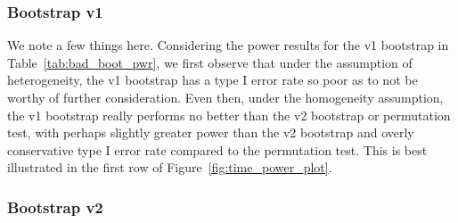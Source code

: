 \documentclass{article}
\begin{document}
\subsubsection{Bootstrap v1}

We note a few things here. Considering the power results for the v1 bootstrap in Table~\ref{tab:bad_boot_pwr}, we first observe that under the assumption of heterogeneity, the v1 bootstrap has a type I error rate so poor as to not be worthy of further consideration. Even then, under the homogeneity assumption, the v1 bootstrap really performs no better than the v2 bootstrap or permutation test, with perhaps slightly greater power than the v2 bootstrap and overly conservative type I error rate compared to the permutation test. This is best illustrated in the first row of Figure~\ref{fig:time_power_plot}.



\subsubsection{Bootstrap v2}
\end{document}
